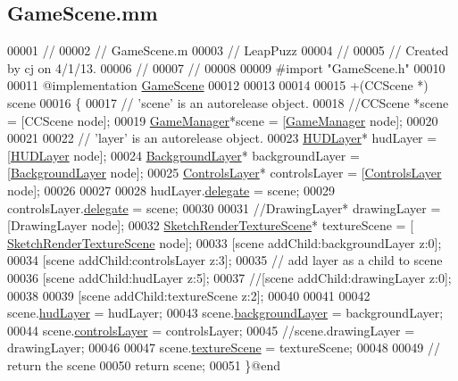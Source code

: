 \hypertarget{_game_scene_8mm}{\subsection{Game\-Scene.\-mm}
\label{d1/d6a/_game_scene_8mm}
}

\begin{DoxyCode}
00001 \textcolor{comment}{//}
00002 \textcolor{comment}{//  GameScene.m}
00003 \textcolor{comment}{//  LeapPuzz}
00004 \textcolor{comment}{//}
00005 \textcolor{comment}{//  Created by cj on 4/1/13.}
00006 \textcolor{comment}{//}
00007 \textcolor{comment}{//}
00008 
00009 \textcolor{preprocessor}{#import "GameScene.h"}
00010 
00011 \textcolor{keyword}{@implementation }\hyperlink{interface_game_scene}{GameScene}
00012 
00013 
00014 
00015 +(CCScene *) scene
00016 \{
00017     \textcolor{comment}{// 'scene' is an autorelease object.}
00018     \textcolor{comment}{//CCScene *scene = [CCScene node];}
00019     \hyperlink{interface_game_manager}{GameManager}*scene = [\hyperlink{interface_game_manager}{GameManager} node];
00020     
00021     
00022     \textcolor{comment}{// 'layer' is an autorelease object.}
00023     \hyperlink{interface_h_u_d_layer}{HUDLayer}* hudLayer = [\hyperlink{interface_h_u_d_layer}{HUDLayer} node];
00024     \hyperlink{interface_background_layer}{BackgroundLayer}* backgroundLayer = [\hyperlink{interface_background_layer}{BackgroundLayer} node];
00025     \hyperlink{interface_controls_layer}{ControlsLayer}* controlsLayer = [\hyperlink{interface_controls_layer}{ControlsLayer} node];
00026     
00027     
00028     hudLayer.\hyperlink{interface_h_u_d_layer_a64cb26c1f8c5a76e8f392a02291c0cf6}{delegate} = scene;
00029     controlsLayer.\hyperlink{interface_controls_layer_aebfe5471226d1bc0afef5d662219f913}{delegate} = scene;
00030     
00031     \textcolor{comment}{//DrawingLayer* drawingLayer = [DrawingLayer node];}
00032     \hyperlink{interface_sketch_render_texture_scene}{SketchRenderTextureScene}* textureScene = [
      \hyperlink{interface_sketch_render_texture_scene}{SketchRenderTextureScene} node];
00033     [scene addChild:backgroundLayer z:0];
00034     [scene addChild:controlsLayer z:3];
00035     \textcolor{comment}{// add layer as a child to scene}
00036     [scene addChild:hudLayer z:5];
00037     \textcolor{comment}{//[scene addChild:drawingLayer z:0];}
00038 
00039     [scene addChild:textureScene z:2];
00040     
00041 
00042     scene.\hyperlink{interface_game_manager_ae286fb2f9d31810d73c7231a574b56b0}{hudLayer} = hudLayer;
00043     scene.\hyperlink{interface_game_manager_a2a3a96f1202b13592f244cf1402b4051}{backgroundLayer} = backgroundLayer;
00044     scene.\hyperlink{interface_game_manager_a0ee5903be06e4a676ddde4c1f03530a7}{controlsLayer} = controlsLayer;
00045     \textcolor{comment}{//scene.drawingLayer = drawingLayer;}
00046 
00047     scene.\hyperlink{interface_game_manager_a79a86ff991f39b3007d99ca61af21253}{textureScene} = textureScene;
00048     
00049     \textcolor{comment}{// return the scene}
00050     \textcolor{keywordflow}{return} scene;
00051 \}\textcolor{keyword}{@end}
\end{DoxyCode}
